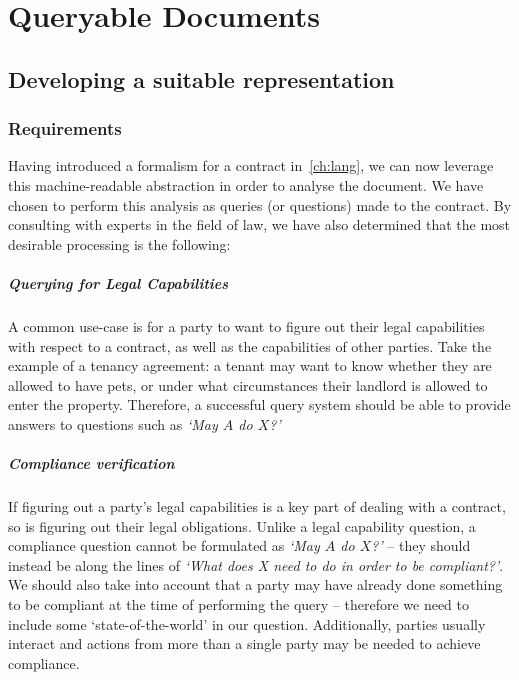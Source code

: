 \chapter{Queryable Documents}\label{ch:queries}


\section{Developing a suitable representation}\label{sec:queries-representation}

\subsection{Requirements}\label{subsec:queries-requirements}

Having introduced a formalism for a contract in~\autoref{ch:lang}, we can now leverage this machine-readable abstraction in order to analyse the document.
We have chosen to perform this analysis as queries (or questions) made to the contract.
By consulting with experts in the field of law, we have also determined that the most desirable processing is the following:

\paragraph{Querying for Legal Capabilities} A common use-case is for a party to want to figure out their legal capabilities with respect to a contract, as well as the capabilities of other parties.
Take the example of a tenancy agreement: a tenant may want to know whether they are allowed to have pets, or under what circumstances their landlord is allowed to enter the property.
Therefore, a successful query system should be able to provide answers to questions such as \textit{`May $A$ do $X$?'}

\paragraph{Compliance verification} If figuring out a party's legal capabilities is a key part of dealing with a contract, so is figuring out their legal obligations.
Unlike a legal capability question, a compliance question cannot be formulated as \textit{`May $A$ do $X$?'} -- they should instead be along the lines of \textit{`What does X need to do in order to be compliant?'}.
We should also take into account that a party may have already done something to be compliant at the time of performing the query -- therefore we need to include some `state-of-the-world' in our question.
Additionally, parties usually interact and actions from more than a single party may be needed to achieve compliance.

